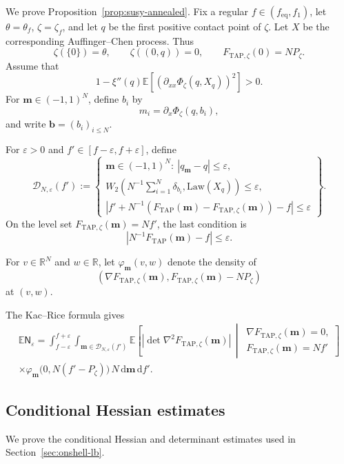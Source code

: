 \documentclass[a4paper,10pt,reqno]{amsart}
\numberwithin{equation}{section}
\newcommand{\dR}{\mathbb{R}}%
\newcommand{\ve}{\varepsilon}
\newcommand{\dE}{\mathbb{E}}%
\newcommand{\Law}{\mathrm{Law}}
\newcommand{\dd}{\mathrm{d}}
\newcommand{\TAP}{\mathrm{TAP}}
\newcommand{\eq}{\mathrm{eq}}
\newcommand{\bfm}{\mathbf{m}}
\newcommand{\bfb}{\mathbf{b}}
\begin{document}
	We prove Proposition~\ref{prop:susy-annealed}.
	Fix a regular \(f\in(f_{\eq},f_1)\), let
	\(\theta=\theta_f\), \(\zeta=\zeta_f\), and let \(q\) be the first
	positive contact point of \(\zeta\). Let \(X\) be the corresponding
	Auffinger--Chen process. Thus
	\[
	\zeta(\{0\})=\theta,
	\qquad
	\zeta((0,q))=0,
	\qquad
	F_{\TAP,\zeta}(0)=NP_\zeta.
	\]
	Assume that
	\[
	1-\xi''(q)\dE\left[
	\left(
	\partial_{xx}\Phi_\zeta(q,X_q)
	\right)^2
	\right]>0.
	\]
	For \(\bfm\in(-1,1)^N\), define \(b_i\) by
	\[
	m_i=\partial_x\Phi_\zeta(q,b_i),
	\]
	and write \(\bfb=(b_i)_{i\le N}\).
	
	For \(\ve>0\) and \(f'\in[f-\ve,f+\ve]\), define
	\[
	\mathcal D_{N,\ve}(f')
	:=
	\left\{
	\begin{array}{l}
		\bfm\in(-1,1)^N:\ |q_\bfm-q|\le\ve,\\[1mm]
		W_2\left(
		N^{-1}\sum_{i=1}^N\delta_{b_i},
		\Law(X_q)
		\right)\le\ve,\\[1mm]
		\left|
		f'
		+N^{-1}\left(
		F_{\TAP}(\bfm)-F_{\TAP,\zeta}(\bfm)
		\right)
		-f
		\right|\le\ve
	\end{array}
	\right\}.
	\]
	On the level set \(F_{\TAP,\zeta}(\bfm)=Nf'\), the last condition is
	\[
	\left|N^{-1}F_{\TAP}(\bfm)-f\right|\le\ve.
	\]
	
	For \(v\in\dR^N\) and \(w\in\dR\), let
	\(\varphi_\bfm(v,w)\) denote the density of
	\[
	\left(
	\nabla F_{\TAP,\zeta}(\bfm),
	F_{\TAP,\zeta}(\bfm)-NP_\zeta
	\right)
	\]
	at \((v,w)\).
	
	The Kac--Rice formula gives
	\begin{multline}\label{eq:one-point-kac-rice-window}
		\dE\mathsf N_\ve
		=
		\int_{f-\ve}^{f+\ve}
		\int_{\bfm\in\mathcal D_{N,\ve}(f')}
		\dE\!\left[
		|\det\nabla^2 F_{\TAP,\zeta}(\bfm)|
		\,\middle|\,
		\substack{
			\nabla F_{\TAP,\zeta}(\bfm)=0,\\
			F_{\TAP,\zeta}(\bfm)=Nf'}
		\right]\\
		\times
		\varphi_\bfm\bigl(0,N(f'-P_\zeta)\bigr)
		\,N\,\dd\bfm\,\dd f'.
	\end{multline}
	
	\subsection{Conditional Hessian estimates}
	
	We prove the conditional Hessian and determinant estimates used in
	Section~\ref{sec:onshell-lb}.
	
\end{document}
